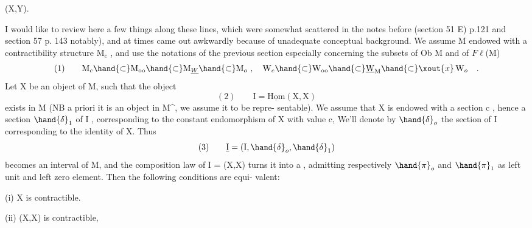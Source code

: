 
\hand{\uline{\textcolor{black}{Application to relation between contractibility and objects}}} \hand{\uline{\textcolor{black}{Hom}}}(X,Y).

I would like to review here a few things along these lines, which were
somewhat scattered in the notes before (section 51 E) p.121 and section 57
p. 143 notably), and at times came out awkwardly because of unadequate
conceptual background. We assume M endowed with a contractibility structure
$\mathrm{M}_c$ , and use the notations of the previous section\unsure{;|,} especially concerning
the subsets of Ob M and of $F\ell$(M)
\[ (1) \qquad \mathrm{M}_c \hand{\subset} \mathrm{M}_{\mathrm{oo}} \hand{\subset} \mathrm{M}_{\underline{W}} \hand{\subset} \mathrm{M}_o \ , \quad \mathrm{W}_c \hand{\subset} \mathrm{W}_{\mathrm{oo}} \hand{\subset} \underline{\mathrm{W}}_{\mathrm{M}} \hand{\subset} \xout{x}\, \mathrm{W}_o \quad . \]
Let X be an object of M, such that the object 
\[ (2) \qquad \mathrm{I} = \underline{\mathrm{Hom}}(\mathrm{X},\mathrm{X}) \]
exists in M (NB a priori it is an object in M\^{}, we assume it to be repre-%
sentable). We assume that X is endowed with a section c , hence a section
 $\hand{\delta}_1$ of I , corresponding to the constant endomorphism of X with value c,
We'll denote by $\hand{\delta}_o$ the section of I corresponding to the identity of X.
Thus
\[ (3) \qquad \underline{\mathrm{I}} = (\mathrm{I},\hand{\delta}_o,\hand{\delta}_1) \]
becomes an interval of M, and the composition law of I = \hand{\uline{\textcolor{black}{Hom}}}(X,X) turns
it into a \hand{\uline{\textcolor{black}{multiplicative}}} \hand{\uline{\textcolor{black}{interval}}} , admitting respectively $\hand{\pi}_o$ and $\hand{\pi}_1$ as
left unit and left zero element. Then the following conditions are equi-%
valent:

(i) X is contractible.

(ii) \hand{\uline{\textcolor{black}{Hom}}}(X,X) is contractible, 


